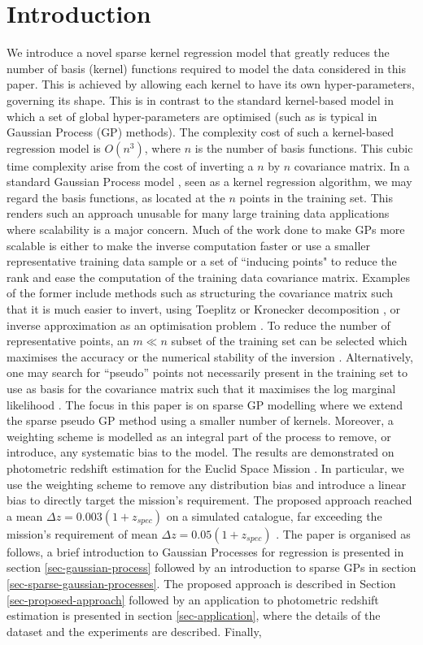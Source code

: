 \documentclass[useAMS,usenatbib,fleqn]{mn2e}
\begin{document}
\section{Introduction}
We introduce a novel sparse kernel regression model that greatly reduces the number of basis (kernel) functions required to model the data considered in this paper. This is achieved by allowing each kernel to have its own hyper-parameters, governing its shape. This is in contrast to the standard kernel-based model in which a set of global hyper-parameters are optimised (such as is typical in Gaussian Process (GP) methods). The complexity cost of such a kernel-based regression model is $O\left(n^{3}\right)$, where $n$ is the number of basis functions. This cubic time complexity arise from the cost of inverting a $n$ by $n$ covariance matrix. In a standard Gaussian Process model \citep{rasmussen2006gaussian}, seen as a kernel regression algorithm, we may regard the basis functions, as located at the $n$ points in the training set. This renders such an approach unusable for many large training data applications where scalability is a major concern. Much of the work done to make GPs more scalable is either to make the inverse computation faster or use a smaller representative training data sample or a set of ``inducing points" to reduce the rank and ease the computation of the training data covariance matrix. Examples of the former include methods such as structuring the covariance matrix such that it is much easier to invert, using Toeplitz  \citep{zhang2005time} or Kronecker decomposition \citep{tsiligkaridis2013}, or inverse approximation as an optimisation problem \citep{gibbs97}. To reduce the number of representative points, an $m \ll n$ subset of the training set can be selected which maximises the accuracy or the numerical stability of the inversion \citep{foster2009}. Alternatively, one may search for ``pseudo'' points not necessarily present in the training set to use as basis for the covariance matrix such that it maximises the log marginal likelihood \citep{snelson2005}. The focus in this paper is on sparse GP modelling where we extend the sparse pseudo GP method using a smaller number of kernels. Moreover, a weighting scheme is modelled as an integral part of the process to remove, or introduce, any systematic bias to the model. The results are demonstrated on photometric redshift estimation for the Euclid Space Mission \citep{laureijs2011}. In particular, we use the weighting scheme to remove any distribution bias and introduce a linear bias to directly target the mission's requirement. The proposed approach reached a mean $\Delta z = 0.003(1+z_{spec})$ on a simulated catalogue, far exceeding the mission's requirement of mean $\Delta z = 0.05(1+z_{spec})$ \citep{laureijs2011}. The paper is organised as follows, a brief introduction to Gaussian Processes for regression is presented in section \ref{sec-gaussian-process} followed by an introduction to sparse GPs in section \ref{sec-sparse-gaussian-processes}. The proposed approach is described in Section \ref{sec-proposed-approach} followed by an application to photometric redshift estimation is presented in section \ref{sec-application}, where the details of the dataset and the experiments are described. Finally, 
\end{document}
